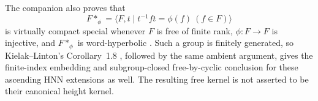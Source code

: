 The companion also proves that
\[
F*_\phi=\langle F,t\mid t^{-1}ft=\phi(f)\ (f\in F)\rangle
\]
is virtually compact special whenever $F$ is free of finite rank,
$\phi:F\to F$ is injective, and $F*_\phi$ is word-hyperbolic
\cite[Theorem~1.2]{OpenAIVirtualSpecialness}. Such a group is finitely
generated, so Kielak--Linton's Corollary~1.8
\cite{KielakLinton2024Virtually}, followed by the same ambient argument,
gives the finite-index embedding and subgroup-closed free-by-cyclic
conclusion for these ascending HNN extensions as well. The resulting
free kernel is not asserted to be their canonical height kernel.

